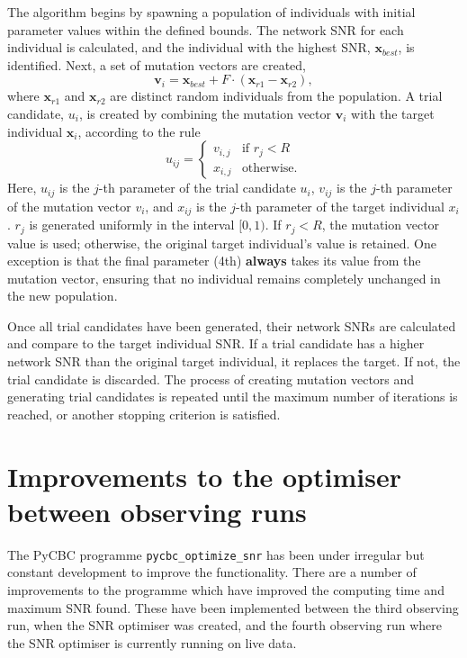 The algorithm begins by spawning a population of individuals with initial parameter values within the defined bounds. The network SNR for each individual is calculated, and the individual with the highest SNR, \( \mathbf{x}_{best} \), is identified. Next, a set of mutation vectors are created,
%
\begin{equation}
    \mathbf{v}_i = \mathbf{x}_{best} + F \cdot (\mathbf{x}_{r1} - \mathbf{x}_{r2}),
\end{equation}
%
where \( \mathbf{x}_{r1} \) and \( \mathbf{x}_{r2} \) are distinct random individuals from the population. A trial candidate, \( u_i \), is created by combining the mutation vector \( \mathbf{v}_i \) with the target individual \( \mathbf{x}_i \), according to the rule
%
\begin{equation}
    u_{ij} = 
    \begin{cases} 
    v_{i,j} & \text{if } r_j < R \\ 
    x_{i,j} & \text{otherwise}.
    \end{cases}
\end{equation}
%
Here, \( u_{ij} \) is the \( j \)-th parameter of the trial candidate \( u_i \), \( v_{ij} \) is the \( j \)-th parameter of the mutation vector \( v_i \), and \( x_{ij} \) is the \( j \)-th parameter of the target individual \( x_i \). \( r_j \) is generated uniformly in the interval \([0, 1)\). If \( r_j < R \), the mutation vector value is used; otherwise, the original target individual's value is retained. One exception is that the final parameter (4th) \textbf{always} takes its value from the mutation vector, ensuring that no individual remains completely unchanged in the new population.

Once all trial candidates have been generated, their network SNRs are calculated and compare to the target individual SNR. If a trial candidate has a higher network SNR than the original target individual, it replaces the target. If not, the trial candidate is discarded. The process of creating mutation vectors and generating trial candidates is repeated until the maximum number of iterations is reached, or another stopping criterion is satisfied.

\section{\label{7:sec:additional-improvements}Improvements to the optimiser between observing runs}

The PyCBC programme \texttt{pycbc\_optimize\_snr} has been under irregular but constant development to improve the functionality. There are a number of improvements to the programme which have improved the computing time and maximum SNR found. These have been implemented between the third observing run, when the SNR optimiser was created, and the fourth observing run where the SNR optimiser is currently running on live data. 

